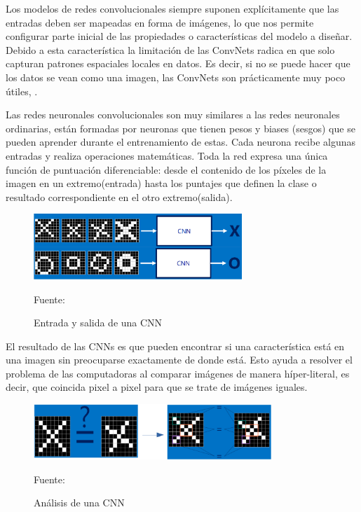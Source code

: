 	\vskip 0.4cm  
	Los modelos de redes convolucionales siempre suponen explícitamente que las entradas deben ser mapeadas en forma de imágenes, lo que nos permite configurar parte inicial de las propiedades o características del modelo a diseñar.  Debido a esta característica la limitación de las ConvNets radica en que solo capturan patrones espaciales locales en datos. Es decir, si no se puede hacer que los datos se vean como una imagen, las ConvNets son prácticamente muy poco útiles, \citep{Rohrer}.

	\vskip 0.4cm  
	Las redes neuronales convolucionales son muy similares a las redes neuronales ordinarias, están formadas por neuronas que tienen pesos y biases (sesgos) que se pueden aprender durante el entrenamiento de estas. Cada neurona recibe algunas entradas y realiza operaciones matemáticas. Toda la red expresa una única función de puntuación diferenciable: desde el contenido de los píxeles de la imagen en un extremo(entrada) hasta los puntajes que definen la clase o resultado correspondiente en el otro extremo(salida).

	\begin{figure}[H]
	\begin{center}
	\includegraphics[width=0.7\textwidth]{images/marcoteorico/entr_salida}
	\end{center}
	\begin{center}
	\caption{\small{Entrada y salida de una CNN}}
	\vskip -0.25cm
	{\small{Fuente: \cite{Rohrer}}}
	\end{center}
	\vspace{-1.5em}
	\end{figure}

	El resultado de las CNNs es que pueden encontrar si una característica está en una imagen sin preocuparse exactamente de donde está. Esto ayuda a resolver el problema de las computadoras al comparar imágenes de manera híper-literal, es decir, que coincida pixel a pixel para que se trate de imágenes iguales.

	\begin{figure}[H]
	\begin{center}
	\includegraphics[width=0.8\textwidth]{images/marcoteorico/literalcomp}
	\end{center}
	\begin{center}
	\caption{\small{Análisis de una CNN}}
	\vskip -0.25cm
	{\small{Fuente: \cite{Rohrer}}}
	\end{center}
	\vspace{-1.5em}
	\end{figure}

